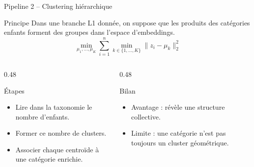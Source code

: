 \documentclass[11pt,aspectratio=169]{beamer}
\begin{document}
\begin{frame}{Pipeline 2 -- Clustering hiérarchique}
\small
\begin{block}{Principe}
Dans une branche L1 donnée, on suppose que les produits des catégories enfants forment des groupes dans l'espace d'embeddings.
\[
\min_{\mu_1,\ldots,\mu_K}\sum_{i=1}^{n}\min_{k\in\{1,\ldots,K\}}\|z_i-\mu_k\|_2^2
\]
\end{block}

\begin{columns}
\begin{column}{0.48\textwidth}
\begin{block}{Étapes}
\begin{itemize}
    \item Lire dans la taxonomie le nombre d'enfants.
    \item Former ce nombre de clusters.
    \item Associer chaque centroïde à une catégorie enrichie.
\end{itemize}
\end{block}
\end{column}

\begin{column}{0.48\textwidth}
\begin{block}{Bilan}
\begin{itemize}
    \item Avantage : révèle une structure collective.
    \item Limite : une catégorie n'est pas toujours un cluster géométrique.
\end{itemize}
\end{block}
\end{column}
\end{columns}
\end{frame}
\end{document}

